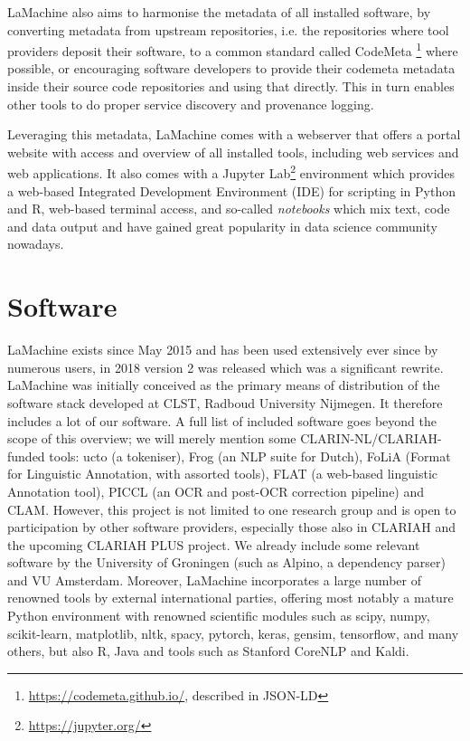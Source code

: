 \documentclass[a4paper,11pt]{article}
\begin{document}
LaMachine also aims to harmonise the metadata of all installed software, by converting metadata from upstream
repositories, i.e. the repositories where tool providers deposit their software, to a common standard called CodeMeta
\footnote{\url{https://codemeta.github.io/}, described in JSON-LD} \cite{codemeta,codemetar} where possible, or
encouraging software developers to provide their codemeta metadata inside their source code repositories and using
that directly. This in turn enables other tools to do proper service discovery and provenance logging.

Leveraging this metadata, LaMachine comes with a webserver that offers a portal website with
access and overview of all installed tools, including web services and web applications. It also comes with a
Jupyter Lab\footnote{\url{https://jupyter.org/}} environment which provides a web-based Integrated Development
Environment (IDE) for scripting in Python and R, web-based terminal access, and so-called \emph{notebooks} which mix
text, code and data output and have gained great popularity in data science community nowadays.

\section{Software}

LaMachine exists since May 2015 and has been used extensively ever since by numerous users, in 2018 version 2 was
released which was a significant rewrite. LaMachine was initially conceived as the primary means of distribution of the
software stack developed at CLST, Radboud University Nijmegen. It therefore includes a lot of our software.  A full list
of included software goes beyond the scope of this overview; we will merely mention some CLARIN-NL/CLARIAH-funded tools:
ucto (a tokeniser), Frog (an NLP suite for Dutch), FoLiA (Format for Linguistic Annotation, with assorted tools), FLAT
(a web-based linguistic Annotation tool), PICCL (an OCR and post-OCR correction pipeline) and CLAM. However, this
project is not limited to one research group and is open to participation by other software providers, especially those
also in CLARIAH and the upcoming CLARIAH PLUS project. We already include some relevant software by the University of
Groningen (such as Alpino, a dependency parser) and VU Amsterdam. Moreover, LaMachine incorporates a large number of
renowned tools by external international parties, offering most notably a mature Python environment with renowned
scientific modules such as scipy, numpy, scikit-learn, matplotlib, nltk, spacy, pytorch, keras, gensim, tensorflow, and many others,
but also R, Java and tools such as Stanford CoreNLP and Kaldi.
\end{document}
